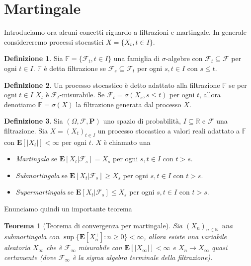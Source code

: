 \documentclass[a4paper,11pt]{book}
\theoremstyle{plain}
\newtheorem{teo}{Teorema}[chapter]
\theoremstyle{definition}
\newtheorem{defn}{Definizione}[chapter]
\theoremstyle{remark}
\newcommand{\R}{\mathbb{R}}
\newcommand{\N}{\mathbb{N}}
\newcommand{\F}{\mathcal{F}}
\newcommand{\Pro}{\mathbf{P}}
\newcommand{\E}{\mathbf{E}}
\begin{document}
\section{Martingale}
Introduciamo ora alcuni concetti riguardo a filtrazioni e martingale. In generale considereremo processi stocastici $X = \{X_t,t\in I\}$.
\begin{defn}
	Sia $\mathbb{F}=\{\F_t,t\in I\}$ una famiglia di $\sigma$-algebre con $\F_t\subseteq \F$ per ogni $t\in I$. $\mathbb{F}$ è detta filtrazione se $\F_s\subseteq \F_t$ per ogni $s,t\in I$ con $s\leq t$.
\end{defn}
\begin{defn}
	Un processo stocastico è detto adattato alla filtrazione $\mathbb{F}$ se per ogni $t\in I$ $X_t$ è $\F_t$-misurabile. Se $\F_t=\sigma(X_s,s\leq t)$ per ogni $t$, allora denotiamo $\mathbb{F}=\sigma(X)$ la filtrazione generata dal processo $X$.
\end{defn}
\begin{defn}
	Sia $(\Omega,\F,\Pro)$ uno spazio di probabilità,  $I\subseteq \R$ e $\F$ una filtrazione. Sia $X=(X_t)_{t\in I}$ un processo stocastico a valori reali adattato a $\mathbb{F}$ con $\E[|X_t|]<\infty$ per ogni $t$. $X$ è chiamato una
	\begin{itemize}
		\item \textit{Martingala} se $\E[X_t|\F_s] = X_s$ per ogni $s,t\in I$ con $t>s$.
		\item \textit{Submartingala} se $\E[X_t|\F_s]\geq  X_s$ per ogni $s,t\in I$ con $t>s$. 
		\item \textit{Supermartingala} se $\E[X_t|\F_s] \leq X_s$ per ogni $s,t\in I$ con $t>s$.
	\end{itemize}
\end{defn}
Enunciamo quindi un importante teorema
\begin{teo}[Teorema di convergenza per martingale]
	Sia $(X_n)_{n\in\N}$  una submartingala con $\sup\{\E[X_n^+]:n\geq 0\}<\infty$, allora esiste una variabile aleatoria $X_\infty$ che è $\F_\infty$ misurabile con $\E[|X_\infty|]<\infty$ e $X_n\rightarrow X_\infty$ quasi certamente (dove $\F_\infty$ è la sigma algebra terminale della filtrazione).	
\end{teo}
\end{document}
